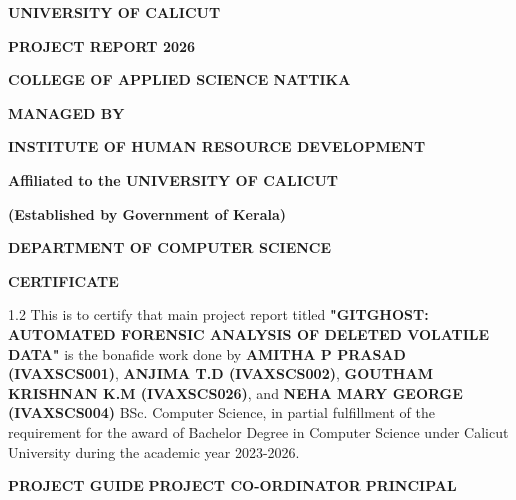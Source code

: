 \documentclass[12pt, a4paper, oneside]{report}
\begin{document}
\begin{center}
    {\large \textbf{UNIVERSITY OF CALICUT} \par}
    \vspace{0.4cm}
    {\large \textbf{PROJECT REPORT 2026} \par}
    \vspace{0.4cm}
    {\LARGE \textbf{COLLEGE OF APPLIED SCIENCE NATTIKA} \par}
    \vspace{0.4cm}
    {\small \textbf{MANAGED BY} \par}
    {\small \textbf{INSTITUTE OF HUMAN RESOURCE DEVELOPMENT} \par}
    {\small \textbf{Affiliated to the UNIVERSITY OF CALICUT} \par}
    {\small \textbf{(Established by Government of Kerala)} \par}
    
    \vspace{0.6cm}
    \begin{figure}[H]
        \centering
    \end{figure}
    
    \vspace{0.5cm}
    {\Large \textbf{DEPARTMENT OF COMPUTER SCIENCE} \par}
    \vspace{0.5cm}
    {\Large \textbf{CERTIFICATE} \par}
\end{center}
\vspace{0.2cm}
\begin{spacing}{1.2}
This is to certify that main project report titled \textbf{"GITGHOST: AUTOMATED FORENSIC ANALYSIS OF DELETED VOLATILE DATA"} is the bonafide work done by \textbf{AMITHA P PRASAD (IVAXSCS001)}, \textbf{ANJIMA T.D (IVAXSCS002)}, \textbf{GOUTHAM KRISHNAN K.M (IVAXSCS026)}, and \textbf{NEHA MARY GEORGE (IVAXSCS004)} BSc. Computer Science, in partial fulfillment of the requirement for the award of Bachelor Degree in Computer Science under Calicut University during the academic year 2023-2026.
\end{spacing}

\vspace{1.2cm}
\noindent \textbf{PROJECT GUIDE} \hfill \textbf{PROJECT CO-ORDINATOR} \hfill \textbf{PRINCIPAL}
\end{document}
